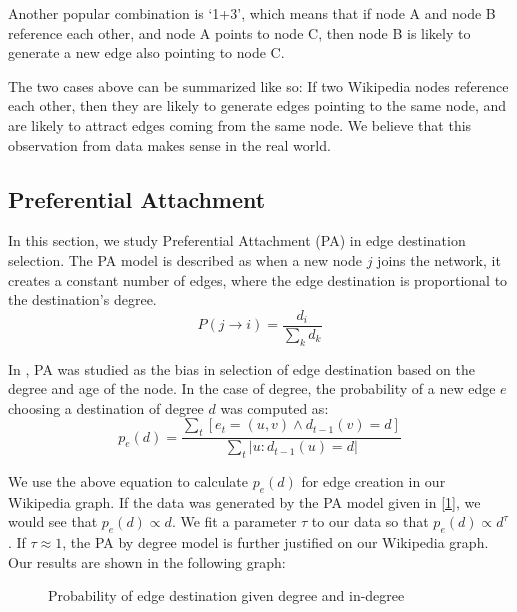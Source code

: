 \documentclass[10pt,twocolumn]{article}
\begin{document}
Another popular combination is `1+3', which means that if node A and node B reference each other, and node A points to node C, then node B is likely to generate a new edge also pointing to node C.

The two cases above can be summarized like so: If two Wikipedia nodes reference each other, then they are likely to generate edges pointing to the same node, and are likely to attract edges coming from the same node. We believe that this observation from data makes sense in the real world.

\subsection{Preferential Attachment}
In this section, we study Preferential Attachment (PA) in edge destination selection. The PA model is described as when a new node $j$ joins the network, it creates a constant number of edges, where the edge destination is proportional to the destination's degree.
\begin{equation}
\label{1}
P(j\rightarrow i)=\frac{d_i}{\sum\limits_{k}d_k}
\end{equation}

In \cite{leskovec2008microscopic}, PA was studied as the bias in selection of edge destination based on the degree and age of the node. In the case of degree, the probability of a new edge $e$ choosing a destination of degree $d$ was computed as:
\begin{equation}
\label{2}
p_e(d)=\frac{\sum\limits_{t}[e_t=(u,v)\wedge d_{t-1}(v)=d]}{\sum\limits_{t}|u:d_{t-1}(u)=d|}
\end{equation}

We use the above equation to calculate $p_e(d)$ for edge creation in our Wikipedia graph. If the data was generated by the PA model given in \eqref{1}, we would see that $p_e(d)\propto d$. We fit a parameter $\tau$ to our data so that $p_e(d)\propto d^\tau$. If $\tau \approx 1$, the PA by degree model is further justified on our Wikipedia graph. Our results are shown in the following graph:
\begin{figure}
\caption{Probability of edge destination given degree and in-degree}\label{fig:pa_degree}
\end{figure}
\end{document}
